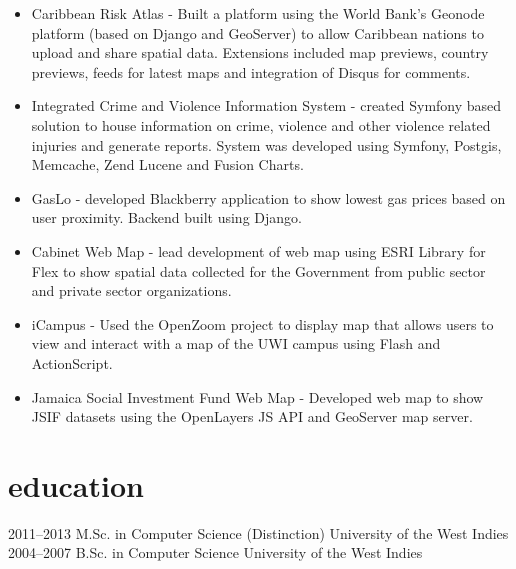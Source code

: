 \documentclass[]{cv-style}          %
\begin{document}
\begin{entrylist}
{\begin{itemize}
\item Caribbean Risk Atlas - Built a platform using the World Bank's Geonode platform (based on Django and GeoServer) to allow Caribbean nations to upload and share spatial data. Extensions included map previews, country previews, feeds for latest maps and integration of Disqus for comments.
\item Integrated Crime and Violence Information System - created Symfony based solution to house information on crime, violence and other violence related injuries and generate reports. System was developed using Symfony, Postgis, Memcache, Zend Lucene and Fusion Charts.
\item GasLo - developed Blackberry  application  to  show  lowest  gas  prices  based  on  user proximity. Backend built using Django.
\item Cabinet Web Map - lead development of web map using ESRI Library for Flex to show spatial data collected for the Government from public sector and private sector organizations.
\item iCampus - Used the OpenZoom project to display map that allows users to view and interact with a map of the UWI campus using Flash and ActionScript.
\item Jamaica Social Investment Fund Web Map - Developed web map to show JSIF datasets using the OpenLayers JS API and GeoServer map server. 
\end{itemize}
}
\end{entrylist}


\section{education}

\begin{entrylist}
\entry
{2011--2013}
{M.Sc. {\normalfont in Computer Science (Distinction)}}
{University of the West Indies}
{\vspace{-0.3cm}}
\entry
{2004--2007}
{B.Sc. {\normalfont in Computer Science}}
{University of the West Indies}
{}
\end{entrylist}
\end{document}
